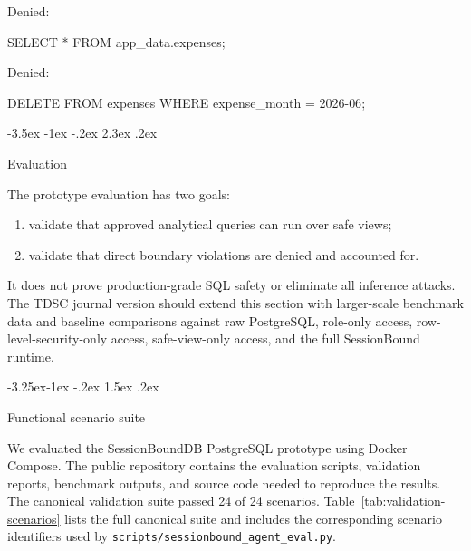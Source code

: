 \documentclass[10pt,twocolumn]{article}
\makeatletter
\newenvironment{Shaded}{}{}
\newcommand{\KeywordTok}[1]{\textcolor[rgb]{0.00,0.44,0.13}{#1}}
\newcommand{\NormalTok}[1]{#1}
\newcommand{\OperatorTok}[1]{\textcolor[rgb]{0.40,0.40,0.40}{#1}}
\newcommand{\StringTok}[1]{\textcolor[rgb]{0.25,0.44,0.63}{#1}}
\providecommand{\tightlist}{%
  \setlength{\itemsep}{0pt}\setlength{\parskip}{0pt}}
\renewcommand\section{\@startsection{section}{1}{\z@}%
  {-3.5ex \@plus -1ex \@minus -.2ex}%
  {2.3ex \@plus .2ex}%
  {\normalfont\Large\bfseries\raggedright}}
\renewcommand\subsection{\@startsection{subsection}{2}{\z@}%
  {-3.25ex\@plus -1ex \@minus -.2ex}%
  {1.5ex \@plus .2ex}%
  {\normalfont\large\bfseries\raggedright}}
\makeatother
\begin{document}
Denied:

\begin{Shaded}
\begin{Highlighting}[]
\KeywordTok{SELECT} \OperatorTok{*} \KeywordTok{FROM}\NormalTok{ app\_data.expenses;}
\end{Highlighting}
\end{Shaded}

Denied:

\begin{Shaded}
\begin{Highlighting}[]
\KeywordTok{DELETE} \KeywordTok{FROM}\NormalTok{ expenses }\KeywordTok{WHERE}\NormalTok{ expense\_month }\OperatorTok{=} \StringTok{\textquotesingle{}2026{-}06\textquotesingle{}}\NormalTok{;}
\end{Highlighting}
\end{Shaded}


\hypertarget{evaluation}{%
\section{Evaluation}\label{evaluation}}

The prototype evaluation has two goals:

\begin{enumerate}
\def\labelenumi{\arabic{enumi}.}
\tightlist
\item
  validate that approved analytical queries can run over safe views;
\item
  validate that direct boundary violations are denied and accounted for.
\end{enumerate}

It does not prove production-grade SQL safety or eliminate all inference
attacks. The TDSC journal version should extend this section with
larger-scale benchmark data and baseline comparisons against
raw PostgreSQL, role-only access, row-level-security-only access,
safe-view-only access, and the full SessionBound runtime.

\hypertarget{functional-scenario-suite}{%
\subsection{Functional scenario
suite}\label{functional-scenario-suite}}

We evaluated the SessionBoundDB PostgreSQL prototype using Docker
Compose. The public repository contains the evaluation scripts,
validation reports, benchmark outputs, and source code needed to
reproduce the results. The canonical validation suite passed 24 of 24
scenarios. Table~\ref{tab:validation-scenarios} lists the full canonical
suite and includes the corresponding scenario identifiers used by
\texttt{scripts/sessionbound\_agent\_eval.py}.
\end{document}
